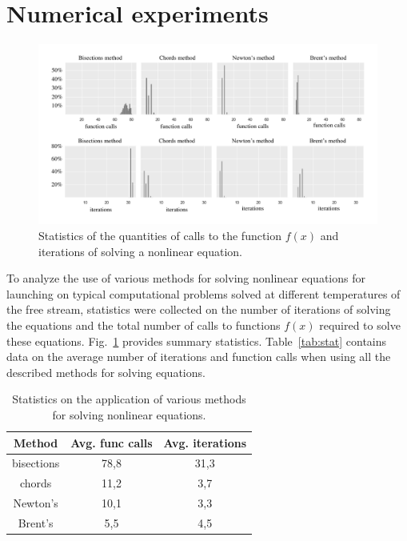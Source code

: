 \documentclass[
11pt,%
tightenlines,%
twoside,%
onecolumn,%
nofloats,%
nobibnotes,%
nofootinbib,%
superscriptaddress,%
noshowpacs,%
centertags]%
{revtex4}
\begin{document}
\section{Numerical experiments}

\begin{figure}[h!]
\setcaptionmargin{5mm}
\onelinecaptionstrue
\includegraphics[width=1\textwidth]{pics/stat.pdf}
\caption{Statistics of the quantities of calls to the function $f(x)$ and iterations of solving a nonlinear equation.}\label{fig:stat}
\end{figure}

To analyze the use of various methods for solving nonlinear equations for launching on typical computational problems solved at different temperatures of the free stream, statistics were collected on the number of iterations of solving the equations and the total number of calls to functions $f(x)$ required to solve these equations.
Fig.~\ref{fig:stat} provides summary statistics.
Table~\ref{tab:stat} contains data on the average number of iterations and function calls when using all the described methods for solving equations.

\begin{table}[h!]
\label{tbl:supercomputers}
\setcaptionmargin{0mm}
\onelinecaptionsfalse
{}
\caption{Statistics on the application of various methods for solving nonlinear equations.}\label{tab:stat}
\bigskip
\begin{tabular}{|c|c|c|}
\hline
Method & Avg. func calls & Avg. iterations \\
\hline
bisections & 78,8 & 31,3 \\
\hline
chords & 11,2 & 3,7 \\
\hline
Newton's & 10,1 & 3,3 \\
\hline
Brent's & 5,5 & 4,5 \\
\hline
\end{tabular}
\label{tab:supercomputers}
\end{table}
\end{document}
